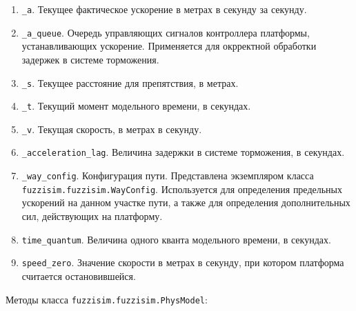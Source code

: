 \begin{enumerate}[label=\arabic*)]
	\item  \lstinline!_a!. Текущее фактическое ускорение в метрах в секунду за секунду.
	\item  \lstinline!_a_queue!. Очередь управляющих сигналов контроллера платформы, устанавливающих ускорение. Применяется для окрректной обработки задержек в системе торможения.
	\item  \lstinline!_s!. Текущее расстояние для препятствия, в метрах.
	\item  \lstinline!_t!. Текущий момент модельного времени, в секундах.
	\item  \lstinline!_v!. Текущая скорость, в метрах в секунду.
	\item  \lstinline!_acceleration_lag!. Величина задержки в системе торможения, в секундах.
	\item  \lstinline!_way_config!. Конфигурация пути. Представлена экземпляром класса \lstinline!fuzzisim.fuzzisim.WayConfig!. Используется для определения предельных ускорений на данном участке пути, а также для определения дополнительных сил, действующих на платформу.
	\item  \lstinline!time_quantum!. Величина одного кванта модельного времени, в секундах.
	\item  \lstinline!speed_zero!. Значение скорости в метрах в секунду, при котором платформа считается остановившейся.
\end{enumerate}
Методы класса \lstinline!fuzzisim.fuzzisim.PhysModel!:
